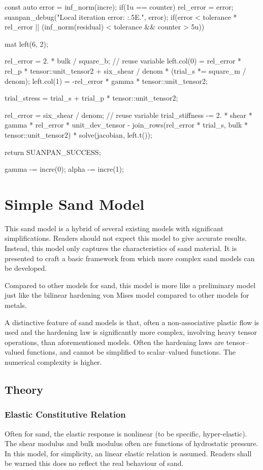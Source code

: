 \begin{cppcode}
{{        const auto error = inf_norm(incre);
        if(1u == counter) rel_error = error;
        suanpan_debug("Local iteration error: {:.5E}.\n", error);
        if(error < tolerance * rel_error || (inf_norm(residual) < tolerance && counter > 5u)) {
            mat left(6, 2);

            rel_error = 2. * bulk / square_b; // reuse variable
            left.col(0) = rel_error * rel_p * tensor::unit_tensor2 + six_shear / denom * (trial_s *= square_m / denom);
            left.col(1) = -rel_error * gamma * tensor::unit_tensor2;

            trial_stress = trial_s + trial_p * tensor::unit_tensor2;

            rel_error = six_shear / denom; // reuse variable
            trial_stiffness -= 2. * shear * gamma * rel_error * unit_dev_tensor - join_rows(rel_error * trial_s, bulk * tensor::unit_tensor2) * solve(jacobian, left.t());

            return SUANPAN_SUCCESS;
        }

        gamma -= incre(0);
        alpha -= incre(1);
    }
}
\end{cppcode}
\section{Simple Sand Model}
This sand model is a hybrid of several existing models with significant simplifications. Readers should not expect this model to give accurate results. Instead, this model only captures the characteristics of sand material. It is presented to craft a basic framework from which more complex sand models can be developed.

Compared to other models for sand, this model is more like a preliminary model just like the bilinear hardening von Mises model compared to other models for metals.

A distinctive feature of sand models is that, often a non-associative plastic flow is used and the hardening law is significantly more complex, involving heavy tensor operations, than aforementioned models. Often the hardening laws are tensor--valued functions, and cannot be simplified to scalar--valued functions. The numerical complexity is higher.
\subsection{Theory}
\subsubsection{Elastic Constitutive Relation}
Often for sand, the elastic response is nonlinear (to be specific, hyper-elastic). The shear modulus and bulk modulus often are functions of hydrostatic pressure. In this model, for simplicity, an linear elastic relation is assumed. Readers shall be warned this does no reflect the real behaviour of sand.

